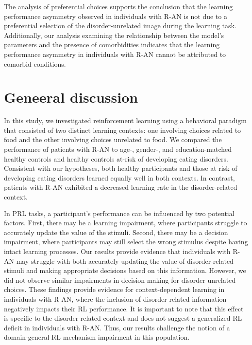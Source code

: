 \documentclass[
  man,floatsintext]{apa6}
\begin{document}
The analysis of preferential choices supports the conclusion that the learning performance asymmetry observed in individuals with R-AN is not due to a preferential selection of the disorder-unrelated image during the learning task. Additionally, our analysis examining the relationship between the model's parameters and the presence of comorbidities indicates that the learning performance asymmetry in individuals with R-AN cannot be attributed to comorbid conditions.

\hypertarget{geneeral-discussion}{%
\section{Geneeral discussion}\label{geneeral-discussion}}

In this study, we investigated reinforcement learning using a behavioral paradigm that consisted of two distinct learning contexts: one involving choices related to food and the other involving choices unrelated to food. We compared the performance of patients with R-AN to age-, gender-, and education-matched healthy controls and healthy controls at-risk of developing eating disorders. Consistent with our hypotheses, both healthy participants and those at risk of developing eating disorders learned equally well in both contexts. In contrast, patients with R-AN exhibited a decreased learning rate in the disorder-related context.

In PRL tasks, a participant's performance can be influenced by two potential factors. First, there may be a learning impairment, where participants struggle to accurately update the value of the stimuli. Second, there may be a decision impairment, where participants may still select the wrong stimulus despite having intact learning processes. Our results provide evidence that individuals with R-AN may struggle with both accurately updating the value of disorder-related stimuli and making appropriate decisions based on this information. However, we did not observe similar impairments in decision making for disorder-unrelated choices. These findings provide evidence for context-dependent learning in individuals with R-AN, where the inclusion of disorder-related information negatively impacts their RL performance. It is important to note that this effect is specific to the disorder-related context and does not suggest a generalized RL deficit in individuals with R-AN. Thus, our results challenge the notion of a domain-general RL mechanism impairment in this population.
\end{document}
